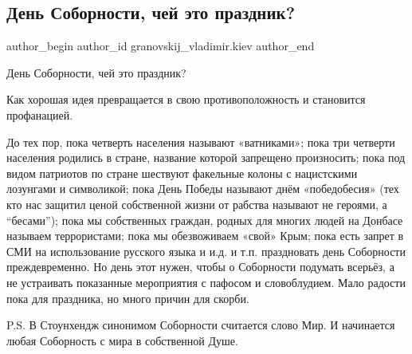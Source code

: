  
 
 
 
 
 
\subsection{День Соборности, чей это праздник?}
\label{sec:22_01_2022.fb.granovskij_vladimir.kiev.1.den_sobornosti}
 
\ifcmt
 author_begin
   author_id granovskij_vladimir.kiev
 author_end
\fi

День Соборности, чей это праздник? 

Как хорошая идея превращается в свою противоположность и становится
профанацией. 


До тех пор, пока четверть населения называют «ватниками»; пока три четверти
населения родились в стране, название которой запрещено произносить; пока под
видом патриотов по стране шествуют факельные колоны с нацистскими лозунгами и
символикой; пока День Победы называют днём «победобесия» (тех кто нас защитил
ценой собственной жизни от рабства называют не героями, а \enquote{бесами}); пока мы
собственных граждан, родных для многих людей на Донбасе называем террористами;
пока мы обезвоживаем «свой» Крым; пока есть запрет в СМИ на использование
русского языка и и.д. и т.п. праздновать день Соборности преждевременно. Но
день этот нужен, чтобы о Соборности подумать всерьёз, а не устраивать
показанные мероприятия  с пафосом и словоблудием. Мало радости пока для
праздника, но много причин для скорби.

P.S. В Стоунхендж синонимом Соборности считается слово Мир. И начинается любая
Соборность с мира в собственной Душе.
